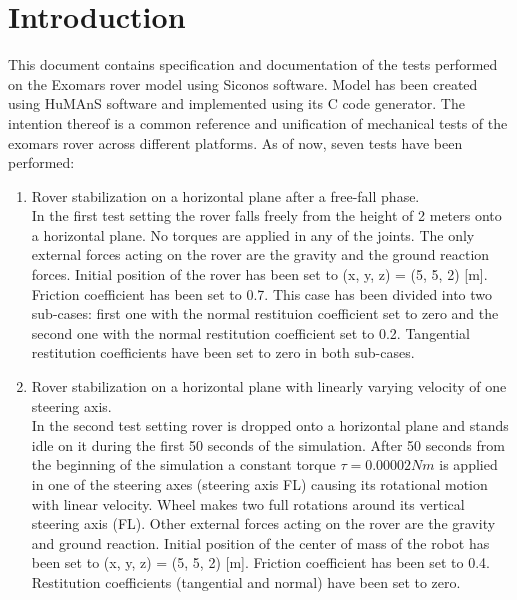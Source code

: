 \documentclass[a4paper]{article}
\begin{document}
\setcounter{page}{1}



\section{Introduction}

This document contains specification and documentation of the tests performed 
on the Exomars rover model using Siconos software. Model has been created using HuMAnS software and implemented using its C code generator. 
The intention thereof is a common reference and unification of mechanical tests of the exomars rover across different platforms. As of now, seven tests have been performed:

\begin{enumerate}

  \item Rover stabilization on a horizontal plane after a free-fall phase.\\[1mm]
        In the first test setting the rover falls freely from the height of 2 meters onto a horizontal plane.
        No torques are applied in any of the joints. The only external forces acting on the rover are
        the gravity and the ground reaction forces. Initial position of the rover has been set to (x, y, z) = (5, 5, 2) [m].
        Friction coefficient has been set to 0.7. This case has been divided into two sub-cases: first one with the normal restituion coefficient set to zero and
        the second one with the normal restitution coefficient set to 0.2. Tangential restitution coefficients have been set to zero in both sub-cases. 
  
  \item Rover stabilization on a horizontal plane with linearly varying velocity of one steering axis.\\[1mm]
        In the second test setting rover is dropped onto a horizontal plane and stands idle on it during the first 50 seconds of the simulation.
        After 50 seconds from the beginning of the simulation a constant torque $\tau = 0.00002Nm$ is applied in one of the steering axes (steering axis FL)
        causing its rotational motion with linear velocity. Wheel makes two full rotations around its vertical steering axis (FL). 
        Other external forces acting on the rover are the gravity and ground reaction. Initial position of the center of mass of the robot
        has been set to (x, y, z) = (5, 5, 2) [m]. Friction coefficient has been set to 0.4. Restitution coefficients (tangential and normal) have been set to zero.
        

\end{enumerate}
\end{document}
